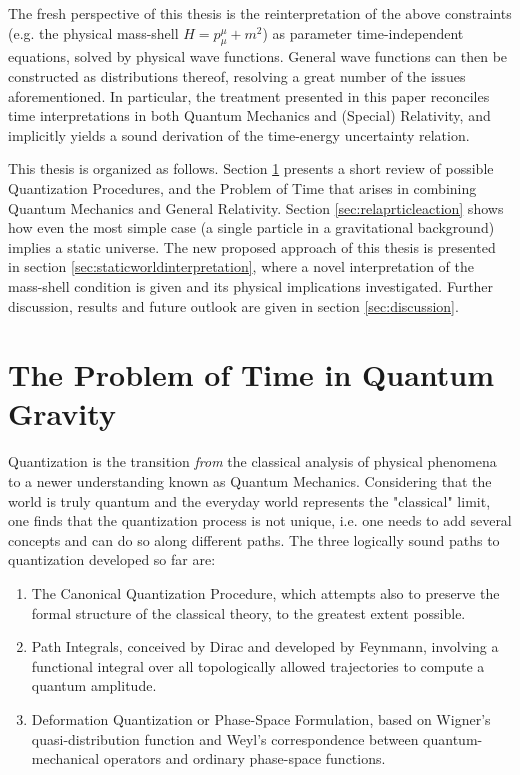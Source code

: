 \documentclass[twoside,a4paper,11pt]{article}
\numberwithin{equation}{section}
\begin{document}
The fresh perspective of this thesis is the reinterpretation of the above constraints (e.g. the physical mass-shell $H = p_\mu ^\mu + m^2$) as parameter time-independent equations, solved by physical wave functions. General wave functions can then be constructed as distributions thereof, resolving a great number of the issues aforementioned. In particular, the treatment presented in this paper reconciles  time interpretations in both Quantum Mechanics and (Special) Relativity, and implicitly yields a sound derivation of the time-energy uncertainty relation.

This thesis is organized as follows. Section \ref{sec:TimeQgrav} presents a short review of possible Quantization Procedures, and the Problem of Time that arises in combining Quantum Mechanics and General Relativity.  Section \ref{sec:relaprticleaction} shows how even the most simple case (a single particle in a gravitational background) implies a static universe. The new proposed approach of this thesis is presented in section \ref{sec:staticworldinterpretation}, where a novel interpretation of the mass-shell condition is given and its physical implications investigated. Further discussion, results and future outlook are given in section \ref{sec:discussion}.

\newpage
\section{The Problem of Time in Quantum Gravity}
\label{sec:TimeQgrav}

Quantization is the transition \textit{from} the classical analysis of physical phenomena to a newer understanding known as Quantum Mechanics. Considering that the world is truly quantum and the everyday world represents the "classical" limit, one finds that the quantization process is not unique, i.e. one needs to add several concepts and can do so along different paths.
The three logically sound paths to quantization developed so far are:
\begin{enumerate}
    \item  
The Canonical Quantization Procedure, which attempts also to preserve the formal structure of the classical theory, to the greatest extent possible. 

\item 
Path Integrals, conceived by Dirac and developed by Feynmann, involving a functional integral over all topologically allowed trajectories to compute a quantum amplitude.

\item
Deformation Quantization or Phase-Space Formulation, based on Wigner's quasi-distribution function and Weyl's correspondence between quantum-mechanical operators and ordinary phase-space functions.
\end{enumerate}
\end{document}
